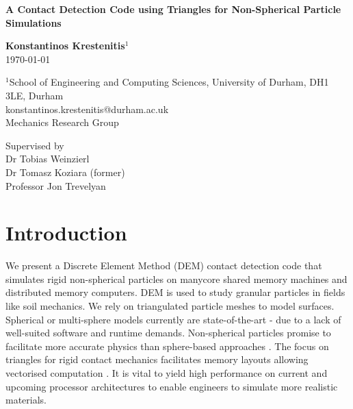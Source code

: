 \documentclass[times,12pt]{article}
\begin{document}
\pagestyle{plain}

\begin{center}
{\fontsize{22}{20}\bf A Contact Detection Code using Triangles for Non-Spherical Particle Simulations\\
}\end{center}

\vspace{\fill}
\begin{center}\fontsize{16}{20}
\textbf{Konstantinos Krestenitis$^1$}\\
\today
\end{center}
\vspace{\fill}

\begin{center}
{\fontsize{10}{12}
}\end{center}

\begin{center}
$^1$School of Engineering and Computing Sciences, University of Durham, DH1 3LE, Durham\\
konstantinos.krestenitis@durham.ac.uk\\
Mechanics Research Group\\
\end{center}
\begin{center}
Supervised by\\
Dr Tobias Weinzierl\\
Dr Tomasz Koziara (former)\\
Professor Jon Trevelyan\\
\end{center}

\clearpage

\tableofcontents

\clearpage

\section{Introduction}
We present a Discrete Element Method (DEM) contact detection code that simulates rigid non-spherical particles on manycore shared memory machines and distributed memory computers. DEM is used to study granular particles in fields like soil mechanics. We rely on triangulated particle meshes to model surfaces. Spherical or multi-sphere models currently are state-of-the-art - due to a lack of well-suited software and runtime demands. Non-spherical particles promise to facilitate more accurate physics than sphere-based approaches \cite{AlonsoMarroqu2013}. The focus on triangles for rigid contact mechanics facilitates memory layouts allowing vectorised computation \cite{Alvarez2007, Koziara2005, Krestenitis2015}. It is vital to yield high performance on current and upcoming processor architectures to enable engineers to simulate more realistic materials.
\end{document}
